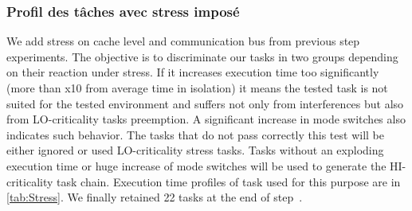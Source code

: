 \documentclass[french, a4paper, 11pt, twoside, pdftex]{StyleThese}
\begin{document}
            \subsubsection{Profil des tâches avec stress imposé}
                        We add stress on cache level and communication bus from previous step experiments.  
                        The objective is to discriminate our tasks in two groups depending on their reaction under stress. If it increases execution time too significantly (more than x10 from average time in isolation) it means the tested task is not suited for the tested environment and suffers not only from interferences but also from LO-criticality tasks preemption. A significant increase in mode switches also indicates such behavior. The tasks that do not pass correctly this test will be either ignored or used LO-criticality stress tasks. 
                        Tasks without an exploding execution time or huge increase of mode switches will be used to generate the HI-criticality task chain. 
                        Execution time profiles of task used for this purpose are in \autoref{tab:Stress}. We finally retained 22 tasks at the end of step~\circleTxt[2].
\end{document}
